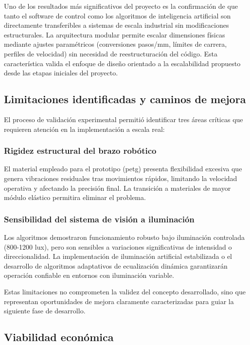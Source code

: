 Uno de los resultados más significativos del proyecto es la confirmación de que tanto el software de control como los algoritmos de inteligencia artificial son directamente transferibles a sistemas de escala industrial sin modificaciones estructurales. La arquitectura modular permite escalar dimensiones físicas mediante ajustes paramétricos (conversiones pasos/mm, límites de carrera, perfiles de velocidad) sin necesidad de reestructuración del código. Esta característica valida el enfoque de diseño orientado a la escalabilidad propuesto desde las etapas iniciales del proyecto.

\subsection*{Limitaciones identificadas y caminos de mejora}

El proceso de validación experimental permitió identificar tres áreas críticas que requieren atención en la implementación a escala real:

\subsubsection*{Rigidez estructural del brazo robótico}

El material empleado para el prototipo (petg) presenta flexibilidad excesiva que genera vibraciones residuales tras movimientos rápidos, limitando la velocidad operativa y afectando la precisión final. La transición a materiales de mayor módulo elástico permitira eliminar el problema.

\subsubsection*{Sensibilidad del sistema de visión a iluminación}

Los algoritmos demostraron funcionamiento robusto bajo iluminación controlada (800-1200 lux), pero son sensibles a variaciones significativas de intensidad o direccionalidad. La implementación de iluminación artificial estabilizada o el desarrollo de algoritmos adaptativos de ecualización dinámica garantizarán operación confiable en entornos con iluminación variable.

Estas limitaciones no comprometen la validez del concepto desarrollado, sino que representan oportunidades de mejora claramente caracterizadas para guiar la siguiente fase de desarrollo.

\subsection*{Viabilidad económica}

